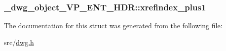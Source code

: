 \hypertarget{struct__dwg__object__VP__ENT__HDR_a0213b867c66ce73a525e481cc161ede2}{
\subsubsection[{xrefindex\-\_\-plus1}]{ {\bf \-\_\-dwg\-\_\-object\-\_\-\-V\-P\-\_\-\-E\-N\-T\-\_\-\-H\-D\-R\-::xrefindex\-\_\-plus1}}}\label{struct__dwg__object__VP__ENT__HDR_a0213b867c66ce73a525e481cc161ede2}


\-The documentation for this struct was generated from the following file\-:\begin{DoxyCompactItemize}
\item 
src/\hyperlink{dwg_8h}{dwg.\-h}\end{DoxyCompactItemize}
